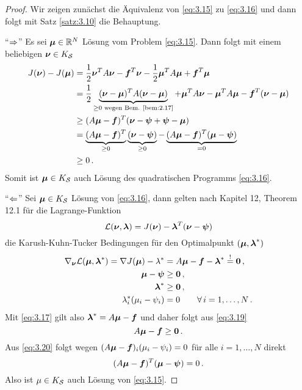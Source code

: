 \begin{itemize}
\begin{proof}
Wir zeigen zunächst die Äquivalenz von \eqref{eq:3.15} zu \eqref{eq:3.16} und dann folgt mit Satz \ref{satz:3.10} die Behauptung.

"`$\Rightarrow$"' Es sei $\boldsymbol\mu \in \mathbb{R}^N$ Lösung vom Problem \eqref{eq:3.15}. Dann folgt mit einem beliebigen $\boldsymbol\nu \in K_{\mathcal S}$
\begin{align*}
	J(\boldsymbol\nu) - J(\boldsymbol\mu) & =  \frac 1 2 \boldsymbol \nu^T A \boldsymbol \nu - \boldsymbol f^T \boldsymbol \nu -  \frac 1 2 \boldsymbol \mu^T A \boldsymbol \mu + \boldsymbol f^T \boldsymbol \mu \\
	& = \frac 1 2\underbrace{ (\boldsymbol\nu-\boldsymbol \mu)^T A(\boldsymbol\nu-\boldsymbol\mu) }_{\ge 0 \text{ wegen Bem. \ref{bem:2.17}}}+ \boldsymbol \mu^T A \boldsymbol \nu - \boldsymbol \mu ^TA \boldsymbol\mu - \boldsymbol f^T (\boldsymbol\nu-\boldsymbol\mu) \\
	& \ge (A\boldsymbol \mu - \boldsymbol f)^T(\boldsymbol\nu-\boldsymbol\psi+\boldsymbol\psi-\boldsymbol\mu) \\
	& = \underbrace{(A\boldsymbol \mu - \boldsymbol f)^T}_{\ge 0} \underbrace{(\boldsymbol\nu-\boldsymbol\psi)}_{\ge 0}- \underbrace{(A\boldsymbol \mu - \boldsymbol f)^T(\boldsymbol\mu-\boldsymbol\psi) }_{=0}\\
	&  \ge 0\, .
\end{align*}
Somit ist $\boldsymbol\mu \in K_{\mathcal S}$ auch Lösung des quadratischen Programms \eqref{eq:3.16}.

"`$\Leftarrow$"' Sei $\boldsymbol\mu \in K_{\mathcal S}$ Lösung von \eqref{eq:3.16}, dann gelten nach \cite{NocWri} Kapitel 12, Theorem 12.1 für die Lagrange-Funktion
\[
	\mathcal L(\boldsymbol\nu,\boldsymbol\lambda) = J(\boldsymbol\nu)-\boldsymbol\lambda^T(\boldsymbol\nu-\boldsymbol\psi)
\]
die Karush-Kuhn-Tucker Bedingungen für den Optimalpunkt $(\boldsymbol \mu,\boldsymbol\lambda^*)$
\begin{align}\label{eq:3.17}
	\nabla_{\boldsymbol\nu} \mathcal L(\boldsymbol\mu,\boldsymbol\lambda^*) = \nabla J(\boldsymbol\mu)-\lambda^* & = A\boldsymbol\mu-\boldsymbol f - \boldsymbol \lambda^* \stackrel != \boldsymbol 0 \, ,\\
	\label{eq:3.18}
	\boldsymbol\mu - \boldsymbol \psi & \ge \boldsymbol 0 \, , \\
	\label{eq:3.19}
	\boldsymbol \lambda^* & \ge \boldsymbol 0 \, , \\
	\label{eq:3.20}
	\lambda_i^* (\mu_i-\psi_i) & = 0 \qquad \forall \, i =1,\ldots,N \, .
\end{align}
Mit \eqref{eq:3.17} gilt also $\boldsymbol\lambda^* = A\boldsymbol\mu-\boldsymbol f$ und daher folgt aus \eqref{eq:3.19}
\[
	A\boldsymbol\mu - \boldsymbol f \ge\boldsymbol 0 \, .
\]
Aus \eqref{eq:3.20} folgt wegen $(A\boldsymbol\mu-\boldsymbol f)_i (\mu_i-\psi_i) = 0$ für alle $i = 1,\ldots,N$ direkt
\[
	(A\boldsymbol\mu - \boldsymbol f)^T (\boldsymbol \mu-\boldsymbol\psi) = 0\, .
\]
Also ist $\mu \in K_{\mathcal S}$ auch Lösung von \eqref{eq:3.15}.
\end{proof}


\end{itemize}
